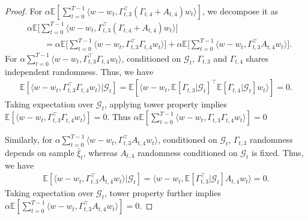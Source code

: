 \documentclass[twoside]{article} %
\theoremstyle{plain}
\theoremstyle{definition}
\theoremstyle{remark}
\newcommand{\calG}{\mathcal{G}}
\begin{document}
\begin{proof}
For $\alpha\mathbb{E}[\sum_{t=0}^{T-1} \langle w-w_t, \Gamma_{t,3}^{\top} (\Gamma_{t,4}+A_{t,4})w_t \rangle] $, we decompose it as
\begin{align}
    &\alpha \mathbb{E}\big[\sum_{t=0}^{T-1} \langle w-w_t, \Gamma_{t,3}^{\top} (\Gamma_{t,4}+A_{t,4})w_t \rangle \big] \nonumber\\
    &\qquad = \alpha \mathbb{E}\big [\sum_{t=0}^{T-1}\langle w-w_t, \Gamma_{t,3}^{\top}\Gamma_{t,4}w_t\rangle \big] + \alpha \mathbb{E}\big[\sum_{t=0}^{T-1}\langle w-w_t, \Gamma_{t,3}^{\top} A_{t,4}w_t \rangle \big] \nonumber.
\end{align}
For $\alpha\sum_{t=0}^{T-1}\langle w-w_t, \Gamma_{t,3}^{\top}\Gamma_{t,4}w_t \rangle$, conditioned on $\calG_t$, $\Gamma_{t,3}$ and $\Gamma_{t,4}$ shares independent randomness. Thus, we have
\begin{align}
    \mathbb{E}[\langle w-w_t, \Gamma_{t,3}^{\top}\Gamma_{t,4}w_t \rangle|\calG_t] = \mathbb{E}[ \langle w-w_t, \mathbb{E}[\Gamma_{t,3}|\calG_t]^{\top}\mathbb{E}[\Gamma_{t,4}|\calG_t]w_t \rangle ] = 0.
    \label{eq: inner product bound 2}
\end{align}
Taking expectation over $\calG_t$, applying tower property implies $\mathbb{E}[\langle w-w_t, \Gamma_{t,3}^{\top}\Gamma_{t,4}w_t \rangle] = 0$. Thus $\alpha\mathbb{E}[\sum_{t=0}^{T-1}\langle w-w_t, \Gamma_{t,3}\Gamma_{t,4}w_t\rangle]=0$

Similarly, for $\alpha \sum_{t=0}^{T-1}\langle w-w_t, \Gamma_{t,3}^{\top} A_{t,4}w_t \rangle$, conditioned on $\calG_t$, $\Gamma_{t,3}$ randomness depends on sample $\bar{\xi}_t$, whereas $A_{t,4}$ randomness conditioned on $\calG_t$ is fixed. Thus, we have
\begin{align}
    \mathbb{E}[\langle w-w_t, \Gamma_{t,3}^{\top} A_{t,4}w_t \rangle|\calG_t]= \langle w-w_t, \mathbb{E}[\Gamma_{t,3}^{\top}|\calG_t] A_{t,4}w_t \rangle = 0.
    \label{eq: inner product bound 3}
\end{align}
Taking expectation over $\calG_t$, tower property further implies $\alpha \mathbb{E}[\sum_{t=0}^{T-1}\langle w-w_t, \Gamma_{t,3}^{\top} A_{t,4}w_t \rangle] = 0$.




\end{proof}
\end{document}

